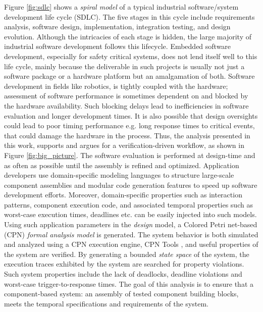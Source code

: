 Figure \ref{fig:sdlc} shows a \emph{spiral model} \cite{boehm1988spiral} of a typical industrial software/system development life cycle (SDLC). The five stages in this cycle include requirements analysis, software design, implementation, integration testing, and design evolution. Although the intricacies of each stage is hidden, the large majority of industrial software development follows this lifecycle. Embedded software development, especially for safety critical systems, does not lend itself well to this life cycle, mainly because the deliverable in such projects is usually not just a software package or a hardware platform but an amalgamation of both. Software development in fields like robotics, is tightly coupled with the hardware; assessment of software performance is sometimes dependent on and blocked by the hardware availability. Such blocking delays lead to inefficiencies in software evaluation and longer development times. It is also possible that design oversights could lead to poor timing performance e.g. long response times to critical events, that could damage the hardware in the process. Thus, the analysis presented in this work, supports and argues for a verification-driven workflow, as shown in Figure \ref{fig:big_picture}. The software evaluation is performed at design-time and as often as possible until the assembly is refined and optimized. Application developers use domain-specific modeling languages to structure large-scale component assemblies and modular code generation features to speed up software development efforts. Moreover, domain-specific properties such as interaction patterns, component execution code, and associated temporal properties such as worst-case execution times, deadlines etc. can be easily injected into such models. Using such application parameters in the \textit{design} model, a Colored Petri net-based (CPN) \cite{CPN} \textit{formal analysis model} is generated. The system behavior is both simulated and analyzed using a CPN execution engine, CPN Tools \cite{CPNTools}, and useful properties of the system are verified. By generating a bounded \emph{state space} of the system, the execution traces exhibited by the system are searched for property violations. Such system properties include the lack of deadlocks, deadline violations and worst-case trigger-to-response times. The goal of this analysis is to ensure that a component-based system: an assembly of tested component building blocks, meets the temporal specifications and requirements of the system.  

